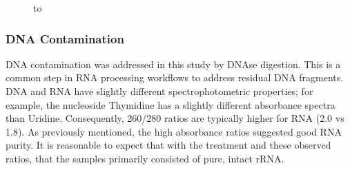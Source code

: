 \begin{figure}
\hbox to 
\end{figure}

\subsubsection{DNA Contamination}
DNA contamination was addressed in this study by DNAse digestion. This is a common step in RNA processing workflows to address residual DNA fragments. DNA and RNA have slightly different spectrophotometric properties; for example, the nucleoside Thymidine has a slightly different absorbance spectra than Uridine. Consequently, 260/280 ratios are typically higher for RNA (2.0 vs 1.8).\cite{205} As previously mentioned, the high absorbance ratios suggested good RNA purity. It is reasonable to expect that with the treatment and these observed ratios, that the samples primarily consisted of pure, intact rRNA.

